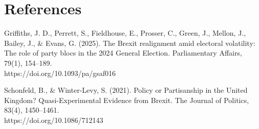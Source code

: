 \documentclass[12pt,letterpaper]{article}
\begin{document}
\section{References}

Griffiths, J. D., Perrett, S., Fieldhouse, E., Prosser, C., Green, J., Mellon, J., Bailey, J., \& Evans, G. (2025). The Brexit realignment amid electoral volatility: The role of party blocs in the 2024 General Election. Parliamentary Affairs, 79(1), 154–189.\\ https://doi.org/10.1093/pa/gsaf016

Schonfeld, B., \& Winter-Levy, S. (2021). Policy or Partisanship in the United Kingdom? Quasi-Experimental Evidence from Brexit. The Journal of Politics, 83(4), 1450–1461.\\ https://doi.org/10.1086/712143
\end{document}
